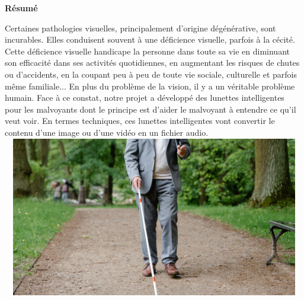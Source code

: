 
\textbf{\huge{Résumé}}\\[4cm]
\begin{center}
Certaines pathologies visuelles, principalement d'origine dégénérative, sont incurables. Elles conduisent souvent à une déficience visuelle, parfois à la cécité. Cette déficience visuelle
handicape la personne dans toute sa vie en diminuant son efficacité dans ses activités quotidiennes, en augmentant les risques de chutes ou d'accidents, en la coupant peu à peu
de toute vie sociale, culturelle et parfois même familiale... En plus du problème de la vision, il y a un véritable problème humain.
Face à ce constat, notre projet a développé des lunettes intelligentes pour les malvoyants dont le principe est d'aider le malvoyant à entendre ce qu'il veut voir. En termes techniques, ces lunettes intelligentes vont convertir le contenu d'une image ou d'une vidéo en un fichier audio. \\[1cm]
\includegraphics[width=14cm, height=7cm]{4-Images/visually-impaired.jpeg}\\[2cm]
\end{center}

